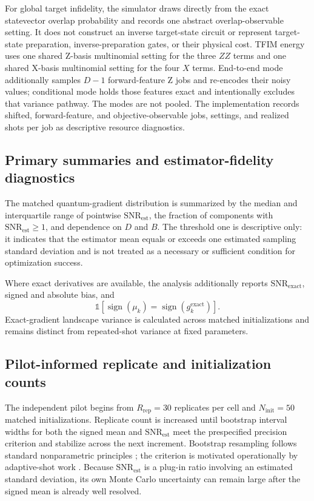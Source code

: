 \documentclass[pdflatex,sn-basic,Numbered]{sn-jnl}
\newcommand{\snrest}{\mathrm{SNR}_{\mathrm{est}}}
\newcommand{\snrexact}{\mathrm{SNR}_{\mathrm{exact}}}
\begin{document}
For global target infidelity, the simulator draws directly from the exact statevector overlap probability and records one abstract overlap-observable setting. It does not construct an inverse target-state circuit or represent target-state preparation, inverse-preparation gates, or their physical cost. TFIM energy uses one shared Z-basis multinomial setting for the three $ZZ$ terms and one shared X-basis multinomial setting for the four $X$ terms. End-to-end mode additionally samples $D-1$ forward-feature Z jobs and re-encodes their noisy values; conditional mode holds those features exact and intentionally excludes that variance pathway. The modes are not pooled. The implementation records shifted, forward-feature, and objective-observable jobs, settings, and realized shots per job as descriptive resource diagnostics.

\subsection{Primary summaries and estimator-fidelity diagnostics}

The matched quantum-gradient distribution is summarized by the median and interquartile range of pointwise $\snrest$, the fraction of components with $\snrest\ge1$, and dependence on $D$ and $B$. The threshold one is descriptive only: it indicates that the estimator mean equals or exceeds one estimated sampling standard deviation and is not treated as a necessary or sufficient condition for optimization success.

Where exact derivatives are available, the analysis additionally reports $\snrexact$, signed and absolute bias, and
\[
\mathbb{1}\!\left[
\operatorname{sign}(\mu_k)
=\operatorname{sign}(g_k^{\mathrm{exact}})
\right].
\]
Exact-gradient landscape variance is calculated across matched initializations and remains distinct from repeated-shot variance at fixed parameters.

\subsection{Pilot-informed replicate and initialization counts}
\label{sec:calibration}

The independent pilot begins from $R_{\mathrm{rep}}=30$ replicates per cell and $N_{\mathrm{init}}=50$ matched initializations. Replicate count is increased until bootstrap interval widths for both the signed mean and $\snrest$ meet the prespecified precision criterion and stabilize across the next increment. Bootstrap resampling follows standard nonparametric principles \cite{davison1997bootstrap}; the criterion is motivated operationally by adaptive-shot work \cite{tamiya2022stochastic}. Because $\snrest$ is a plug-in ratio involving an estimated standard deviation, its own Monte Carlo uncertainty can remain large after the signed mean is already well resolved.
\end{document}
